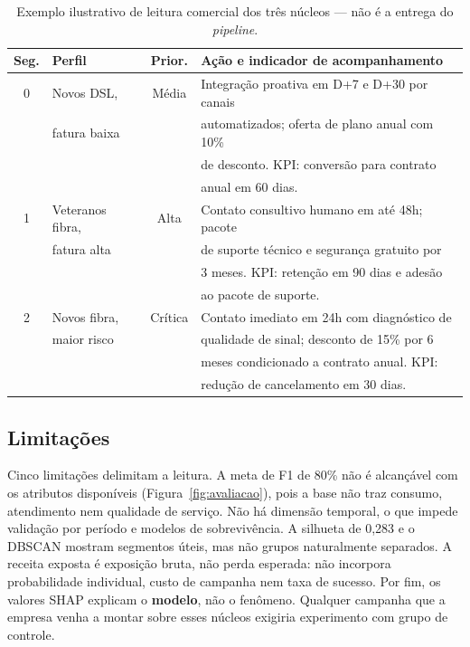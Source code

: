 \documentclass[12pt]{article}
\begin{document}
\begin{table}[ht]
\centering
\caption{Exemplo ilustrativo de leitura comercial dos três núcleos --- não é
a entrega do \textit{pipeline}.}
\label{tab:playbook}
\small
\begin{tabular}{|c|l|c|l|}
\hline
\textbf{Seg.} & \textbf{Perfil} & \textbf{Prior.} & \textbf{Ação e indicador de acompanhamento} \\
\hline
0 & Novos DSL,      & Média   & Integração proativa em D+7 e D+30 por canais \\
  & fatura baixa    &         & automatizados; oferta de plano anual com 10\% \\
  &                 &         & de desconto. KPI: conversão para contrato \\
  &                 &         & anual em 60 dias. \\ \hline
1 & Veteranos fibra,& Alta    & Contato consultivo humano em até 48h; pacote \\
  & fatura alta     &         & de suporte técnico e segurança gratuito por \\
  &                 &         & 3 meses. KPI: retenção em 90 dias e adesão \\
  &                 &         & ao pacote de suporte. \\ \hline
2 & Novos fibra,    & Crítica & Contato imediato em 24h com diagnóstico de \\
  & maior risco     &         & qualidade de sinal; desconto de 15\% por 6 \\
  &                 &         & meses condicionado a contrato anual. KPI: \\
  &                 &         & redução de cancelamento em 30 dias. \\
\hline
\end{tabular}
\end{table}

\subsection{Limitações}
\label{sub:limitacoes}

Cinco limitações delimitam a leitura. A meta de F1 de 80\% não é alcançável
com os atributos disponíveis (Figura~\ref{fig:avaliacao}), pois a base não
traz consumo, atendimento nem qualidade de serviço. Não há dimensão temporal,
o que impede validação por período e modelos de sobrevivência. A silhueta de
0,283 e o DBSCAN mostram segmentos úteis, mas não grupos naturalmente
separados. A receita exposta é exposição bruta, não perda esperada: não
incorpora probabilidade individual, custo de campanha nem taxa de sucesso.
Por fim, os valores SHAP explicam o \textbf{modelo}, não o fenômeno. Qualquer
campanha que a empresa venha a montar sobre esses núcleos exigiria
experimento com grupo de controle.
\end{document}
